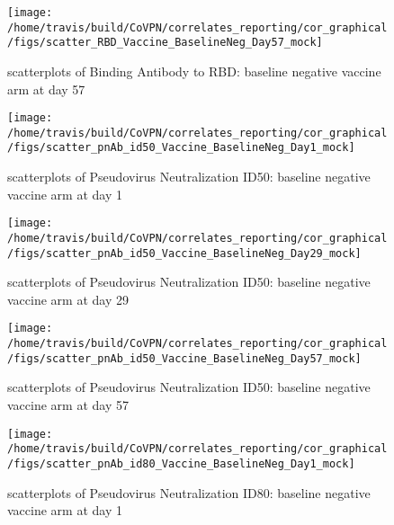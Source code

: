 \documentclass[]{book}
\theoremstyle{definition}
\theoremstyle{definition}
\theoremstyle{definition}
\newcommand{\1}{\mathbbm{1}}
\begin{document}
\clearpage
\begin{figure}[H]

{\centering \texttt{[image: /home/travis/build/CoVPN/correlates\_reporting/cor\_graphical/figs/scatter\_RBD\_Vaccine\_BaselineNeg\_Day57\_mock]} 

}

\caption{scatterplots of Binding Antibody to RBD: baseline negative vaccine arm at day 57}\label{fig:unnamed-chunk-256}
\end{figure}

\clearpage
\begin{figure}[H]

{\centering \texttt{[image: /home/travis/build/CoVPN/correlates\_reporting/cor\_graphical/figs/scatter\_pnAb\_id50\_Vaccine\_BaselineNeg\_Day1\_mock]} 

}

\caption{scatterplots of Pseudovirus Neutralization ID50: baseline negative vaccine arm at day 1}\label{fig:unnamed-chunk-257}
\end{figure}

\clearpage
\begin{figure}[H]

{\centering \texttt{[image: /home/travis/build/CoVPN/correlates\_reporting/cor\_graphical/figs/scatter\_pnAb\_id50\_Vaccine\_BaselineNeg\_Day29\_mock]} 

}

\caption{scatterplots of Pseudovirus Neutralization ID50: baseline negative vaccine arm at day 29}\label{fig:unnamed-chunk-258}
\end{figure}

\clearpage
\begin{figure}[H]

{\centering \texttt{[image: /home/travis/build/CoVPN/correlates\_reporting/cor\_graphical/figs/scatter\_pnAb\_id50\_Vaccine\_BaselineNeg\_Day57\_mock]} 

}

\caption{scatterplots of Pseudovirus Neutralization ID50: baseline negative vaccine arm at day 57}\label{fig:unnamed-chunk-259}
\end{figure}

\clearpage
\begin{figure}[H]

{\centering \texttt{[image: /home/travis/build/CoVPN/correlates\_reporting/cor\_graphical/figs/scatter\_pnAb\_id80\_Vaccine\_BaselineNeg\_Day1\_mock]} 

}

\caption{scatterplots of Pseudovirus Neutralization ID80: baseline negative vaccine arm at day 1}\label{fig:unnamed-chunk-260}
\end{figure}
\end{document}

